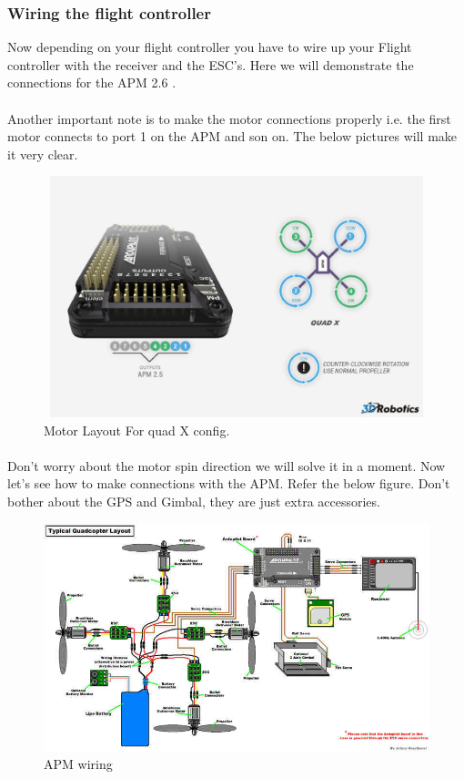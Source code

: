 \documentclass[a4paper,12pt,oneside]{book}
\begin{document}
		\subsubsection{Wiring the flight controller}
		Now depending on your flight controller you have to wire up your Flight controller with the receiver and the ESC's. Here we will demonstrate the connections for the APM 2.6 .
		\paragraph{} Another important note is to make the motor connections properly i.e. the first motor connects to port 1 on the APM and son on. The below pictures will make it very clear.
		\begin{figure}[H]
	 	\centering
		\includegraphics[width=12cm,height=7cm]{direction}
		\caption{Motor Layout For quad X config.}
		\end{figure}
		\paragraph{}Don't worry about the motor spin direction we will solve it in a moment. Now let's see how to make connections with the APM. Refer the below figure. Don't bother about the GPS and Gimbal, they are just extra accessories.
		\begin{figure}[H]
    \begin{center}
    \includegraphics[scale=0.6]{APM}
    \caption{APM wiring}
    \label{fig: figure}
    \end{center}
\end{figure}
\end{document}
